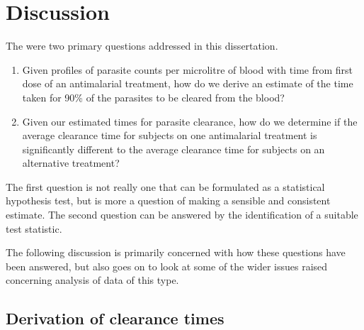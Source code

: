 \chapter{Discussion}\label{ch:discussion}
The were two primary questions addressed in this dissertation.
\begin{enumerate}
\item Given profiles of parasite counts per microlitre of blood with time from first dose of an antimalarial treatment, how do we derive an estimate of the time taken for 90\% of the parasites to be cleared from the blood?
\item Given our estimated times for parasite clearance, how do we determine if the average clearance time for subjects on one antimalarial treatment is significantly different to the average clearance time for subjects on an alternative treatment?
\end{enumerate}
The first question is not really one that can be formulated as a statistical hypothesis test, but is more a question of making a sensible and consistent estimate. The second question can be answered by the identification of a suitable test statistic.

The following discussion is primarily concerned with how these questions have been answered, but also goes on to look at some of the wider issues raised concerning analysis of data of this type.

\section{Derivation of clearance times}

